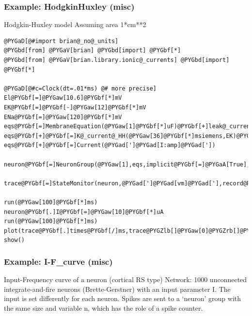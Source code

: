 \documentclass[letterpaper,10pt,english]{manual}
\begin{document}
\resetcurrentobjects
\hypertarget{--doc-examples-misc_HodgkinHuxley}{}

\hypertarget{index-54}{}\subsubsection{Example: HodgkinHuxley (misc)}

Hodgkin-Huxley model
Assuming area 1*cm**2

\begin{Verbatim}[commandchars=@\[\]]
@PYGaD[@#import brian@_no@_units]
@PYGbd[from] @PYGaV[brian] @PYGbd[import] @PYGbf[*]
@PYGbd[from] @PYGaV[brian.library.ionic@_currents] @PYGbd[import] @PYGbf[*]

@PYGaD[@#c=Clock(dt=.01*ms) @# more precise]
El@PYGbf[=]@PYGaw[10.6]@PYGbf[*]mV
EK@PYGbf[=]@PYGbf[-]@PYGaw[12]@PYGbf[*]mV
ENa@PYGbf[=]@PYGaw[120]@PYGbf[*]mV
eqs@PYGbf[=]MembraneEquation(@PYGaw[1]@PYGbf[*]uF)@PYGbf[+]leak@_current(@PYGbf[.]@PYGaw[3]@PYGbf[*]msiemens,El)
eqs@PYGbf[+]@PYGbf[=]K@_current@_HH(@PYGaw[36]@PYGbf[*]msiemens,EK)@PYGbf[+]Na@_current@_HH(@PYGaw[120]@PYGbf[*]msiemens,ENa)
eqs@PYGbf[+]@PYGbf[=]Current(@PYGad[']@PYGad[I:amp]@PYGad['])

neuron@PYGbf[=]NeuronGroup(@PYGaw[1],eqs,implicit@PYGbf[=]@PYGaA[True],freeze@PYGbf[=]@PYGaA[True])

trace@PYGbf[=]StateMonitor(neuron,@PYGad[']@PYGad[vm]@PYGad['],record@PYGbf[=]@PYGaA[True])

run(@PYGaw[100]@PYGbf[*]ms)
neuron@PYGbf[.]I@PYGbf[=]@PYGaw[10]@PYGbf[*]uA
run(@PYGaw[100]@PYGbf[*]ms)
plot(trace@PYGbf[.]times@PYGbf[/]ms,trace@PYGZlb[]@PYGaw[0]@PYGZrb[]@PYGbf[/]mV)
show()
\end{Verbatim}

\resetcurrentobjects
\hypertarget{--doc-examples-misc_I-F_curve}{}

\hypertarget{index-55}{}\subsubsection{Example: I-F\_curve (misc)}

Input-Frequency curve of a neuron (cortical RS type)
Network: 1000 unconnected integrate-and-fire neurons (Brette-Gerstner)
with an input parameter I.
The input is set differently for each neuron.
Spikes are sent to a `neuron' group with the same size and variable n,
which has the role of a spike counter.
\end{document}
